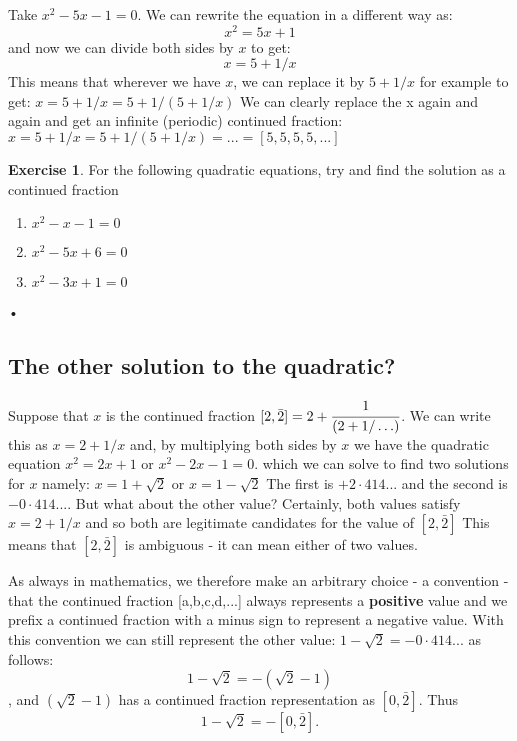 \documentclass[12pt]{amsart}
\theoremstyle{definition}
\newtheorem{xca}[theorem]{Exercise}
\theoremstyle{remark}
\numberwithin{equation}{section}
\begin{document}
Take $x^2 - 5 x - 1 = 0$. We can rewrite the equation in a different way as:
\[x^2 = 5 x + 1\]
and now we can divide both sides by $x$ to get:
\[x = 5 + 1/x\]
This means that wherever we have $x$, we can replace it by $5 + 1/x$ for example to get:
$x = 5 + 1/x = 5 + 1/(5 + 1/x)$
We can clearly replace the x again and again and get an infinite (periodic) continued fraction:
$x = 5 + 1/x = 5 + 1/(5 + 1/x) = ... = [5, 5, 5, 5, ...]$

\begin{xca}
For the following quadratic equations, try and find the solution as a continued fraction 
\begin{enumerate}
\item $x^2-x-1=0$
\item $x^2-5x+6=0$
\item $x^2-3x+1=0$
\end{enumerate}•
\end{xca}
\bigskip
\subsection{The other solution to the quadratic?} Suppose that $x$ is the continued fraction $[2, \bar{2}] = 2 + \cfrac{1}{(2 + 1/ \ldots)}$. We can write this as $x = 2 + 1/x$ and, by multiplying both sides by $x$ we have the quadratic equation
$x^2 = 2x + 1$ or $x^2 - 2x - 1 = 0$. which we can solve to find two solutions for $x$ namely:
$x = 1 + \sqrt{2}$ or $x = 1 - \sqrt{2}$
The first is $+2·414...$ and the second is $-0·414...$. But what about the other value?
Certainly, both values satisfy $x = 2+1/x$ and so both are legitimate candidates for the value of $[2, \bar{2}]$
This means that $[2, \bar{2}]$ is ambiguous - it can mean either of two values.

As always in mathematics, we therefore make an arbitrary choice - a convention - that the continued fraction [a,b,c,d,...] always represents a \textbf{positive} value and we prefix a continued fraction with a minus sign to represent a negative value.
With this convention we can still represent the other value: $1 - \sqrt{2} = -0·414...$ as follows:
\[1 - \sqrt{2}=-(\sqrt{2} - 1)\], and $(\sqrt{2} - 1)$ has a continued fraction representation as $[0,\bar{2}]$.
Thus \[1 - \sqrt{2} = - [0, \bar{2}].\]
\end{document}
